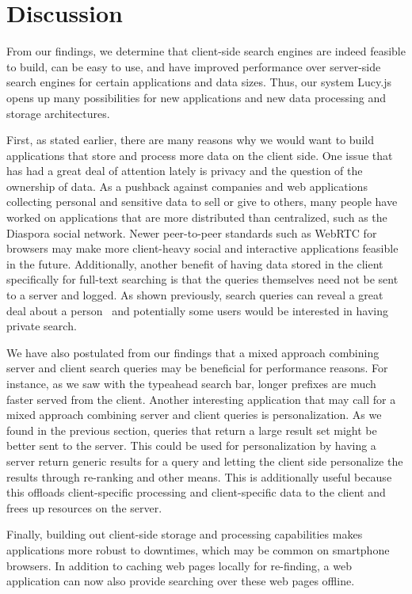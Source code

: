 \documentclass{vldb}
\begin{document}
\section{Discussion}

From our findings, we determine that client-side search engines are indeed feasible to build, can be easy to use, and have improved performance over server-side search engines for certain applications and data sizes. Thus, our system Lucy.js opens up many possibilities for new applications and new data processing and storage architectures.

First, as stated earlier, there are many reasons why we would want to build applications that store and process more data on the client side. One issue that has had a great deal of attention lately is privacy and the question of the ownership of data. As a pushback against companies and web applications collecting personal and sensitive data to sell or give to others, many people have worked on applications that are more distributed than centralized, such as the Diaspora social network. 
Newer peer-to-peer standards such as WebRTC for browsers may make more client-heavy social and interactive applications feasible in the future.
Additionally, another benefit of having data stored in the client specifically for full-text searching is that the queries themselves need not be sent to a server and logged. As shown previously, search queries can reveal a great deal about a person~\cite{teevan2005personalizing, khoshgozaran2009private} and potentially some users would be interested in having private search.

We have also postulated from our findings that a mixed approach combining server and client search queries may be beneficial for performance reasons. For instance, as we saw with the typeahead search bar, longer prefixes are much faster served from the client. 
Another interesting application that may call for a mixed approach combining server and client queries is personalization. As we found in the previous section, queries that return a large result set might be better sent to the server. This could be used for personalization by having a server return generic results for a query and letting the client side personalize the results through re-ranking and other means. This is additionally useful because this offloads client-specific processing and client-specific data to the client and frees up resources on the server.

Finally, building out client-side storage and processing capabilities makes applications more robust to downtimes, which may be common on smartphone browsers. In addition to caching web pages locally for re-finding, a web application can now also provide searching over these web pages offline.
\end{document}
